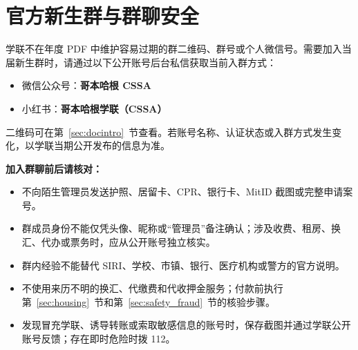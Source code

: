 \section{官方新生群与群聊安全}\label{sec:groups}

学联不在年度 PDF 中维护容易过期的群二维码、群号或个人微信号。需要加入当届新生群时，请通过以下公开账号后台私信获取当前入群方式：

\begin{itemize}
  \item 微信公众号：\textbf{哥本哈根 CSSA}
  \item 小红书：\textbf{哥本哈根学联（CSSA）}
\end{itemize}

二维码可在第~\ref{sec:docintro}~节查看。若账号名称、认证状态或入群方式发生变化，以学联当期公开发布的信息为准。

\begin{grayleftbox}
\textbf{加入群聊前后请核对：}
\begin{itemize}
  \item 不向陌生管理员发送护照、居留卡、CPR、银行卡、MitID 截图或完整申请案号。
  \item 群成员身份不能仅凭头像、昵称或“管理员”备注确认；涉及收费、租房、换汇、代办或票务时，应从公开账号独立核实。
  \item 群内经验不能替代 SIRI、学校、市镇、银行、医疗机构或警方的官方说明。
  \item 不使用来历不明的换汇、代缴费和代收押金服务；付款前执行第~\ref{sec:housing}~节和第~\ref{sec:safety_fraud}~节的核验步骤。
  \item 发现冒充学联、诱导转账或索取敏感信息的账号时，保存截图并通过学联公开账号反馈；存在即时危险时拨 112。
\end{itemize}
\end{grayleftbox}
